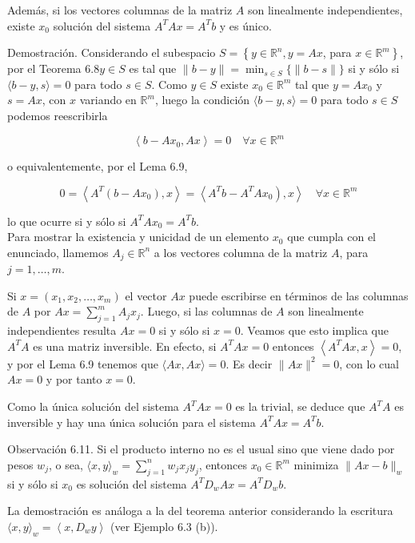 \documentclass[10pt]{article}
\begin{document}
Además, si los vectores columnas de la matriz $A$ son linealmente independientes, existe $x_{0}$ solución del sistema $A^{T} A x=A^{T} b$ y es único.

Demostración. Considerando el subespacio $S=\left\{y \in \mathbb{R}^{n}, y=A x\right.$, para $\left.x \in \mathbb{R}^{m}\right\}$, por el Teorema $6.8 y \in S$ es tal que $\|b-y\|=\min _{s \in S}\{\|b-s\|\}$ si y sólo si $\langle b-y, s\rangle=0$ para todo $s \in S$. Como $y \in S$ existe $x_{0} \in \mathbb{R}^{m}$ tal que $y=A x_{0}$ y $s=A x$, con $x$ variando en $\mathbb{R}^{m}$, luego la condición $\langle b-y, s\rangle=0$ para todo $s \in S$ podemos reescribirla

$$
\left\langle b-A x_{0}, A x\right\rangle=0 \quad \forall x \in \mathbb{R}^{m}
$$

o equivalentemente, por el Lema 6.9,

$$
\left.0=\left\langle A^{T}\left(b-A x_{0}\right), x\right\rangle=\left\langle A^{T} b-A^{T} A x_{0}\right), x\right\rangle \quad \forall x \in \mathbb{R}^{m}
$$

lo que ocurre si y sólo si $A^{T} A x_{0}=A^{T} b$.\\
Para mostrar la existencia y unicidad de un elemento $x_{0}$ que cumpla con el enunciado, llamemos $A_{j} \in \mathbb{R}^{n}$ a los vectores columna de la matriz $A$, para $j=1, \ldots, m$.

Si $x=\left(x_{1}, x_{2}, \ldots, x_{m}\right)$ el vector $A x$ puede escribirse en términos de las columnas de $A$ por $A x=\sum_{j=1}^{m} A_{j} x_{j}$. Luego, si las columnas de $A$ son linealmente independientes resulta $A x=0$ si y sólo si $x=0$. Veamos que esto implica que $A^{T} A$ es una matriz inversible. En efecto, si $A^{T} A x=0$ entonces $\left\langle A^{T} A x, x\right\rangle=0$, y por el Lema 6.9 tenemos que $\langle A x, A x\rangle=0$. Es decir $\|A x\|^{2}=0$, con lo cual $A x=0$ y por tanto $x=0$.

Como la única solución del sistema $A^{T} A x=0$ es la trivial, se deduce que $A^{T} A$ es inversible y hay una única solución para el sistema $A^{T} A x=A^{T} b$.

Observación 6.11. Si el producto interno no es el usual sino que viene dado por pesos $w_{j}$, o sea, $\langle x, y\rangle_{w}=\sum_{j=1}^{n} w_{j} x_{j} y_{j}$, entonces $x_{0} \in \mathbb{R}^{m}$ minimiza $\|A x-b\|_{w}$ si y sólo si $x_{0}$ es solución del sistema $A^{T} D_{w} A x=A^{T} D_{w} b$.

La demostración es análoga a la del teorema anterior considerando la escritura $\langle x, y\rangle_{w}=\left\langle x, D_{w} y\right\rangle$ (ver Ejemplo 6.3 (b)).
\end{document}
